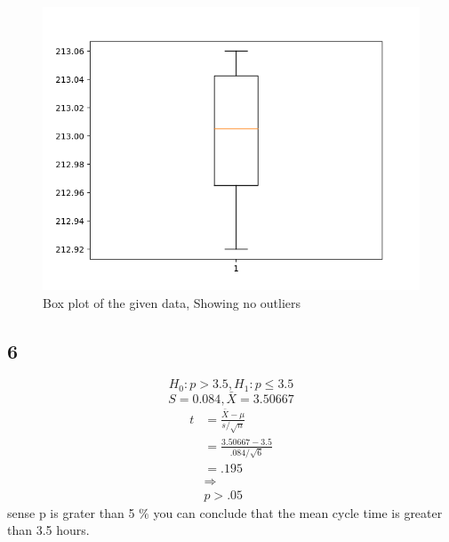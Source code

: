 \documentclass[12pt]{report}
\begin{document}
\begin{enumerate}[label={\bf \alph*}]
\begin{figure}[H]
	\begin{center}
		\includegraphics[width=.70\textwidth]{HW12boxplot3.png}
	\caption{Box plot of the given data, Showing no outliers}
   \label{fig:3}
	\end{center}
   \end{figure}
   \end{enumerate}   
\subsection*{6}
$$H_0:p>3.5,H_1:p\leq 3.5$$
$$S=0.084,\bar{X}=3.50667$$
 \begin{align*}
 t&=\frac{\bar{X}-\mu}{s/\sqrt{n}}\\
  &=\frac{3.50667-3.5}{.084/\sqrt{6}}\\
  &=.195\\
  &\Rightarrow\\
  &p>.05
 \end{align*}
sense p is grater than 5 $\%$ you can conclude that the mean cycle time is greater than 3.5 hours.
\end{document}
